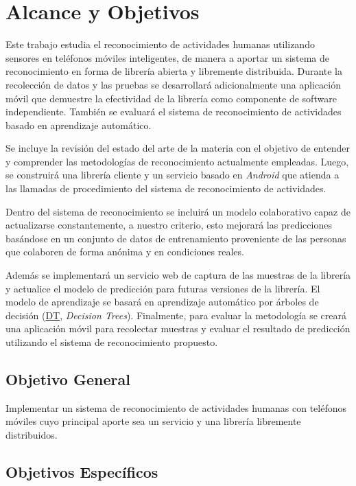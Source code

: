 \section{Alcance y Objetivos}

\label{alcance-y-objetivos}

Este trabajo estudia el reconocimiento de actividades humanas utilizando
sensores en teléfonos móviles inteligentes, de manera a aportar un
sistema de reconocimiento en forma de librería abierta y libremente
distribuida. Durante la recolección de datos y las pruebas se desarrollará
adicionalmente una aplicación móvil que demuestre la efectividad de
la librería como componente de software independiente. También se
evaluará el sistema de reconocimiento de actividades basado en aprendizaje
automático.

Se incluye la revisión del estado del arte de la materia con el objetivo
de entender y comprender las metodologías de reconocimiento actualmente
empleadas. Luego, se construirá una librería cliente y un servicio
basado en \emph{Android} que atienda a las llamadas de procedimiento
del sistema de reconocimiento de actividades. 

Dentro del sistema de reconocimiento se incluirá un modelo colaborativo
capaz de actualizarse constantemente, a nuestro criterio, esto mejorará
las predicciones basándose en un conjunto de datos de entrenamiento
proveniente de las personas que colaboren de forma anónima y en condiciones
reales.

Además se implementará un servicio web de captura de las muestras
de la librería y actualice el modelo de predicción para futuras versiones
de la librería. El modelo de aprendizaje se basará en aprendizaje
automático por árboles de decisión (\hyperlink{abbr}{DT}, \emph{Decision
Trees}). Finalmente, para evaluar la metodología se creará una aplicación
móvil para recolectar muestras y evaluar el resultado de predicción
utilizando el sistema de reconocimiento propuesto.

\subsection{Objetivo General}

\label{objetivo-general}

Implementar un sistema de reconocimiento de actividades humanas con
teléfonos móviles cuyo principal aporte sea un servicio y una librería
libremente distribuidos.

\subsection{Objetivos Específicos}

